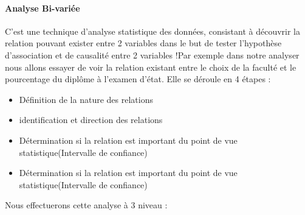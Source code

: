 \paragraph{Analyse Bi-variée}\label{analyse-bivariuxe9e}
C'est une technique d'analyse statistique des données, consistant à
découvrir la relation pouvant exister entre 2 variables dans le but de
tester l'hypothèse d'association et de causalité entre 2 variables !Par
exemple dans notre analyser nous allons essayer de voir la relation
existant entre le choix de la faculté et le pourcentage du diplôme à l'examen d'état. Elle se déroule en 4 étapes : \cite{becker2011uncertainty}
\begin{itemize}
	\item Définition de la nature des relations
	\item  identification et direction des relations 
	\item   Détermination si
	la relation est important du point de vue statistique(Intervalle de
	confiance)
	\item  Détermination si
	la relation est important du point de vue statistique(Intervalle de
	confiance)
\end{itemize}
Nous effectuerons cette analyse à 3 niveau :
